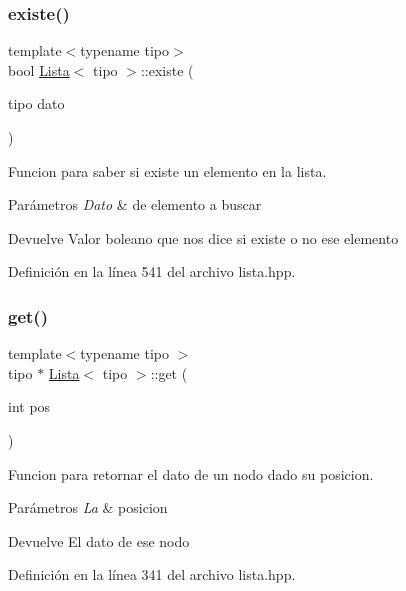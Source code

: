 \subsubsection{\texorpdfstring{existe()}{existe()}}
{\footnotesize\ttfamily template$<$typename tipo$>$ \\
bool \hyperlink{classLista}{Lista}$<$ tipo $>$\+::existe (\begin{DoxyParamCaption}\item[{tipo}]{dato }\end{DoxyParamCaption})}



Funcion para saber si existe un elemento en la lista. 


\begin{DoxyParams}{Parámetros}
{\em Dato} & de elemento a buscar \\
\hline
\end{DoxyParams}
\begin{DoxyReturn}{Devuelve}
Valor boleano que nos dice si existe o no ese elemento 
\end{DoxyReturn}


Definición en la línea 541 del archivo lista.\+hpp.

\mbox{\label{classLista_ada89d0bebdb2db83b7c19c940ab70e62}} 
\subsubsection{\texorpdfstring{get()}{get()}}
{\footnotesize\ttfamily template$<$typename tipo $>$ \\
tipo $\ast$ \hyperlink{classLista}{Lista}$<$ tipo $>$\+::get (\begin{DoxyParamCaption}\item[{int}]{pos }\end{DoxyParamCaption})}



Funcion para retornar el dato de un nodo dado su posicion. 


\begin{DoxyParams}{Parámetros}
{\em La} & posicion \\
\hline
\end{DoxyParams}
\begin{DoxyReturn}{Devuelve}
El dato de ese nodo 
\end{DoxyReturn}


Definición en la línea 341 del archivo lista.\+hpp.

